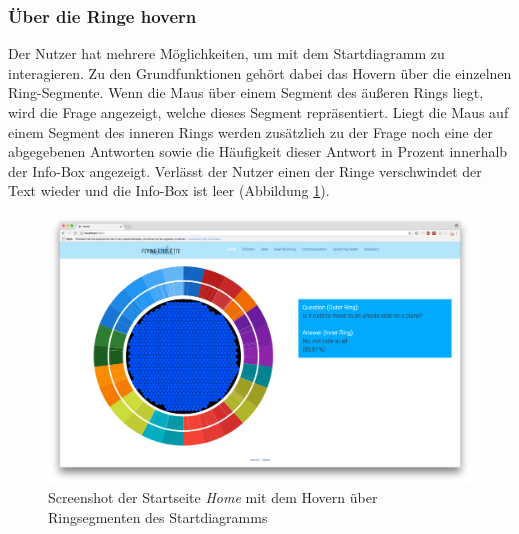 \documentclass{mi-seminar}
\begin{document}
\subsubsection{Über die Ringe hovern}
Der Nutzer hat mehrere Möglichkeiten, um mit dem Startdiagramm zu interagieren. Zu den Grundfunktionen gehört dabei das Hovern über die einzelnen Ring-Segmente. Wenn die Maus über einem Segment des äußeren Rings liegt, wird die Frage angezeigt, welche dieses Segment repräsentiert. Liegt die Maus auf einem Segment des inneren Rings werden zusätzlich zu der Frage noch eine der abgegebenen Antworten sowie die Häufigkeit dieser Antwort in Prozent innerhalb der Info-Box angezeigt. Verlässt der Nutzer einen der Ringe verschwindet der Text wieder und die Info-Box ist leer (Abbildung \ref{ScStartDiagramHover}).
\begin{figure}
\includegraphics[scale=0.3]{assets/start_hover_rings.png}
\caption{Screenshot der Startseite \textit{Home} mit dem Hovern über Ringsegmenten des Startdiagramms}
\label{ScStartDiagramHover}
\end{figure}
\end{document}
